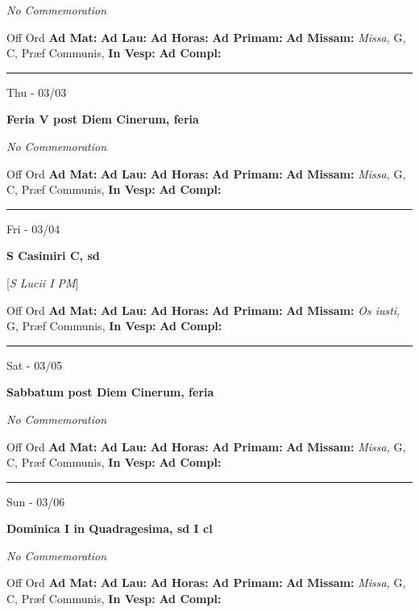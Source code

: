 \documentclass[letterpaper, 10pt]{article}
\begin{document}
\textit{No Commemoration}\begin{justify}
Off Ord
\textbf{Ad Mat: }
\textbf{Ad Lau: }
\textbf{Ad Horas: }
\textbf{Ad Primam: }
\textbf{Ad Missam:} \textit{Missa, } G, C, Præf Communis, 
\textbf{In Vesp: }
\textbf{Ad Compl: }\end{justify}



\hrule
\begin{center}
Thu - 03/03
\end{center}\textbf{ \large Feria V post Diem Cinerum, \textnormal{\normalsize feria}}

\textit{No Commemoration}\begin{justify}
Off Ord
\textbf{Ad Mat: }
\textbf{Ad Lau: }
\textbf{Ad Horas: }
\textbf{Ad Primam: }
\textbf{Ad Missam:} \textit{Missa, } G, C, Præf Communis, 
\textbf{In Vesp: }
\textbf{Ad Compl: }\end{justify}



\hrule
\begin{center}
Fri - 03/04
\end{center}\textbf{ \large S Casimiri C, \textnormal{\normalsize sd}}

[\textit{S Lucii I PM}]
\begin{justify}
Off Ord
\textbf{Ad Mat: }
\textbf{Ad Lau: }
\textbf{Ad Horas: }
\textbf{Ad Primam: }
\textbf{Ad Missam:} \textit{Os iusti, } G, Præf Communis, 
\textbf{In Vesp: }
\textbf{Ad Compl: }\end{justify}



\hrule
\begin{center}
Sat - 03/05
\end{center}\textbf{ \large Sabbatum post Diem Cinerum, \textnormal{\normalsize feria}}

\textit{No Commemoration}\begin{justify}
Off Ord
\textbf{Ad Mat: }
\textbf{Ad Lau: }
\textbf{Ad Horas: }
\textbf{Ad Primam: }
\textbf{Ad Missam:} \textit{Missa, } G, C, Præf Communis, 
\textbf{In Vesp: }
\textbf{Ad Compl: }\end{justify}



\hrule
\begin{center}
Sun - 03/06
\end{center}\textbf{ \large Dominica I in Quadragesima, \textnormal{\normalsize sd I cl}}

\textit{No Commemoration}\begin{justify}
Off Ord
\textbf{Ad Mat: }
\textbf{Ad Lau: }
\textbf{Ad Horas: }
\textbf{Ad Primam: }
\textbf{Ad Missam:} \textit{Missa, } G, C, Præf Communis, 
\textbf{In Vesp: }
\textbf{Ad Compl: }\end{justify}
\end{document}
